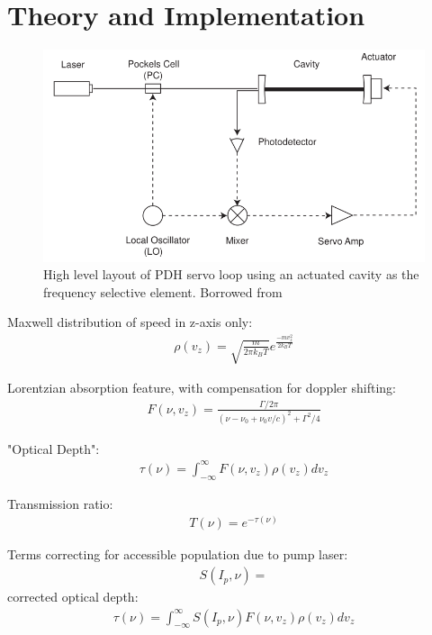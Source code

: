 \newpage
\section{Theory and Implementation}

\begin{figure}[!hrt]
  \centering
  \label{cavity_eom_pdh}
  \includegraphics[scale=0.5]{cavity_eom_pdh.png}
  \caption{High level layout of PDH servo loop using an actuated cavity as
  the frequency selective element. Borrowed from \cite{black1998}}
\end{figure}


Maxwell distribution of speed in z-axis only:
\begin{gather}
  \rho(v_z) = \sqrt{\frac{m}{2\pi k_B T}} e^{\frac{-m v_z^2}{2k_B T}}
\end{gather}

Lorentzian absorption feature, with compensation for doppler shifting:
\begin{gather}
  F(\nu, v_z) = \frac{\Gamma / 2 \pi}{(\nu - \nu_0 + \nu_0 v / c)^2 +
  \Gamma^2 / 4}
\end{gather}

"Optical Depth":
\begin{gather}
  \tau(\nu) = \int_{-\infty}^\infty F(\nu, v_z) \rho(v_z) dv_z
\end{gather}

Transmission ratio:
\begin{gather}
  T(\nu) = e^{-\tau(\nu)}
\end{gather}

Terms correcting for accessible population due to pump laser:
\begin{gather}
  S(I_p, \nu) =
\end{gather}
corrected optical depth:
\begin{gather}
  \tau(\nu) = \int_{-\infty}^\infty S(I_p, \nu) F(\nu, v_z) \rho(v_z) dv_z
\end{gather}